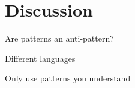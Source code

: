 \section{Discussion}


\begin{frame}{Are patterns an anti-pattern?}
	
\end{frame}

\begin{frame}{Different languages}
	
\end{frame}

\begin{frame}{Only use patterns you understand}
	
\end{frame}